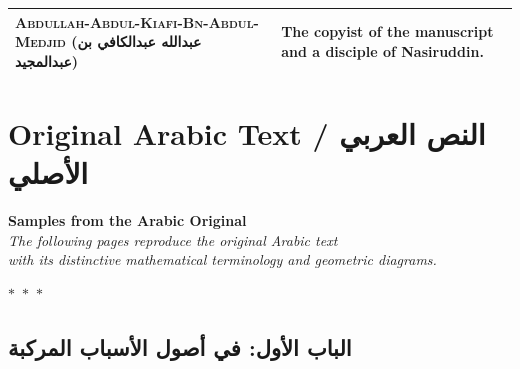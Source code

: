 \documentclass[11pt,a4paper]{article}
\theoremstyle{plain}
\theoremstyle{definition}
\theoremstyle{remark}
\newcommand{\ar}[1]{{\arabicfont\beginR #1\endR}}
\newcommand{\ornament}{\begin{center}\textcolor{goldaccent}{$\ast$~$\ast$~$\ast$}\end{center}}
\begin{document}
\begin{center}
\begin{longtable}{lp{9cm}}
\addlinespace[0.2cm]



\textsc{Abdullah-Abdul-Kiafi-Bn-Abdul-Medjid} (\ar{عبدالله عبدالكافي بن عبدالمجيد}) & The copyist of the manuscript and a disciple of Nasiruddin. \\



\bottomrule

\end{longtable}

\end{center}



\clearpage






\section*{Original Arabic Text / \ar{النص العربي الأصلي}}




\begin{center}

\textcolor{sectioncolor}{\Large\textbf{Samples from the Arabic Original}}\\[0.3cm]

\textcolor{notecolor}{\textit{The following pages reproduce the original Arabic text}}\\

\textcolor{notecolor}{\textit{with its distinctive mathematical terminology and geometric diagrams.}}

\end{center}



\ornament



\subsection*{\ar{الباب الأول: في أصول الأسباب المركبة}}

\end{document}
